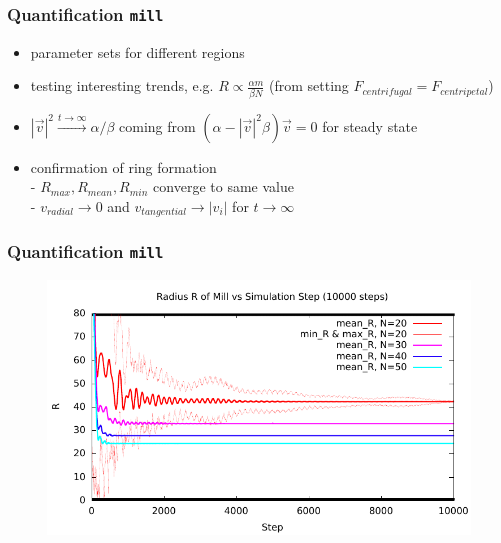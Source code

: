\documentclass[compress]{beamer}
\begin{document}
\begin{frame}
	\frametitle{Quantification \texttt{mill}}
\begin{itemize}
	\item parameter sets for different regions
	\item testing interesting trends, e.g. \( R \propto \frac{\alpha m}{\beta N}\) (from setting \( F_{centrifugal} = F_{centripetal} \))
	\item \( |\vec{v}|^{2}  \xrightarrow{t \to \infty}  \alpha / \beta \) coming from \( (\alpha - |\vec{v}|^2 \beta ) \vec{v} = 0 \) for steady state
	\item confirmation of ring formation \\
	- \( R_{max}, R_{mean}, R_{min} \) converge to same value \\
	- \( v_{radial} \to 0 \) and \( v_{tangential} \to | v_{i} |  \) for \( t \to \infty \)
\end{itemize}
\end{frame}


\begin{frame}
	\frametitle{Quantification \texttt{mill}}	
	\begin{figure}[H]
		\includegraphics[width=1. \columnwidth]{../plots/mill_II_radius_dt_allN.pdf}
	\end{figure}	
\end{frame}

\end{document}
